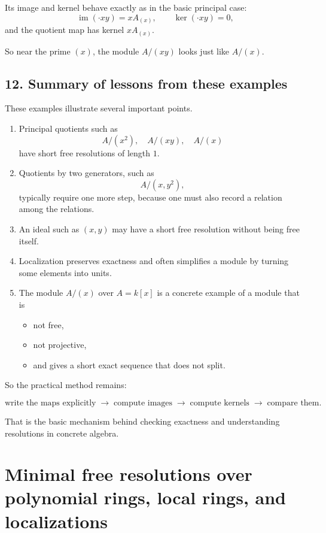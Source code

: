 \documentclass[12pt,a4paper]{article}
\theoremstyle{notespace}
\theoremstyle{definition}
\begin{document}
Its image and kernel behave exactly as in the basic principal case:
\[
\operatorname{im}(\cdot xy)=xA_{(x)},
\qquad
\ker(\cdot xy)=0,
\]
and the quotient map has kernel \(xA_{(x)}\).

So near the prime \((x)\), the module \(A/(xy)\) looks just like \(A/(x)\).

\subsection{12. Summary of lessons from these examples}

These examples illustrate several important points.

\begin{enumerate}
	\item Principal quotients such as
	\[
	A/(x^2), \quad A/(xy), \quad A/(x)
	\]
	have short free resolutions of length \(1\).
	
	\item Quotients by two generators, such as
	\[
	A/(x,y^2),
	\]
	typically require one more step, because one must also record a relation among the relations.
	
	\item An ideal such as \((x,y)\) may have a short free resolution without being free itself.
	
	\item Localization preserves exactness and often simplifies a module by turning some elements into units.
	
	\item The module \(A/(x)\) over \(A=k[x]\) is a concrete example of a module that is
	\begin{itemize}
		\item not free,
		\item not projective,
		\item and gives a short exact sequence that does not split.
	\end{itemize}
\end{enumerate}

So the practical method remains:

\[
\text{write the maps explicitly} \;\longrightarrow\;
\text{compute images} \;\longrightarrow\;
\text{compute kernels} \;\longrightarrow\;
\text{compare them}.
\]

That is the basic mechanism behind checking exactness and understanding resolutions in concrete algebra.

\section{Minimal free resolutions over polynomial rings, local rings, and localizations}
\end{document}
